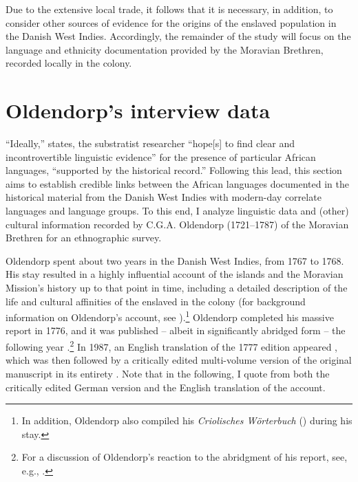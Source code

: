 \documentclass[output=paper,colorlinks,citecolor=brown]{langscibook}
\begin{document}
Due to the extensive local trade, it follows that it is necessary, in addition, to consider other sources of evidence for the origins of the enslaved population in the Danish West Indies. Accordingly, the remainder of the study will focus on the language and ethnicity documentation provided by the Moravian Brethren, recorded locally in the colony.


\section{Oldendorp's interview data}

``Ideally,'' \citet[2]{Kouwenberg_2008} states, the substratist researcher ``hope[s] to find clear and incontrovertible linguistic evidence'' for the presence of particular African languages, ``supported by the historical record.'' Following this lead, this section aims to establish credible links between the African languages documented in the historical material from the Danish West Indies with modern-day correlate languages and language groups. To this end, I analyze linguistic data and (other) cultural information recorded by C.G.A. Oldendorp (1721–1787) of the Moravian Brethren for an ethnographic survey.

Oldendorp spent about two years in the Danish West Indies, from 1767 to 1768. His stay resulted in a highly influential account of the islands and the Moravian Mission’s history up to that point in time, including a detailed description of the life and cultural affinities of the enslaved in the colony (for background information on Oldendorp's account, see \cite{Meier_Stein_Palmie_Ulbricht_2010}).\footnote{In addition, Oldendorp also compiled his \emph{Criolisches Wörterbuch} (\citeyear{Oldendorp_1996}) during his stay.} Oldendorp completed his massive report in 1776, and it was published – albeit in significantly abridged form – the following year \citep{Oldendorp_1777}.\footnote{For a discussion of Oldendorp’s reaction to the abridgment of his report, see, e.g., \citet{Ahlback_2016}.} In 1987, an English translation of the 1777 edition appeared \citep{Highfield_1987}, which was then followed by a critically edited multi-volume version of the original manuscript in its entirety \citep{Oldendorp_2000, Oldendorp_2002}. Note that in the following, I quote from both the critically edited German version and the English translation of the account. 
\end{document}
